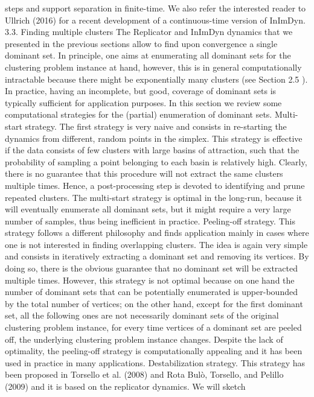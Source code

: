 \documentclass[a4paper]{article}
\begin{document}
steps and support separation in finite-time. We also refer the
interested reader to Ullrich (2016) for a recent development of a
continuous-time version of InImDyn.
3.3. Finding multiple clusters
The Replicator and InImDyn dynamics that we presented in the
previous sections allow to find upon convergence a single dominant
set. In principle, one aims at enumerating all dominant sets for the
clustering problem instance at hand, however, this is in general
computationally intractable because there might be exponentially
many clusters (see Section 2.5 ). In practice, having an incomplete,
but good, coverage of dominant sets is typically sufficient for application
purposes. In this section we review some computational
strategies for the (partial) enumeration of dominant sets.
Multi-start strategy. The first strategy is very naive and consists
in re-starting the dynamics from different, random points in
the simplex. This strategy is effective if the data consists of few
clusters with large basins of attraction, such that the probability of
sampling a point belonging to each basin is relatively high. Clearly,
there is no guarantee that this procedure will not extract the same
clusters multiple times. Hence, a post-processing step is devoted
to identifying and prune repeated clusters. The multi-start strategy
is optimal in the long-run, because it will eventually enumerate
all dominant sets, but it might require a very large number of
samples, thus being inefficient in practice.
Peeling-off strategy. This strategy follows a different philosophy
and finds application mainly in cases where one is not interested
in finding overlapping clusters. The idea is again very simple and
consists in iteratively extracting a dominant set and removing its
vertices. By doing so, there is the obvious guarantee that no dominant
set will be extracted multiple times. However, this strategy
is not optimal because on one hand the number of dominant
sets that can be potentially enumerated is upper-bounded by the
total number of vertices; on the other hand, except for the first
dominant set, all the following ones are not necessarily dominant
sets of the original clustering problem instance, for every time
vertices of a dominant set are peeled off, the underlying clustering
problem instance changes. Despite the lack of optimality, the
peeling-off strategy is computationally appealing and it has been
used in practice in many applications.
Destabilization strategy. This strategy has been proposed
in Torsello et al. (2008) and Rota Bulò, Torsello, and Pelillo
(2009) and it is based on the replicator dynamics. We will sketch
\end{document}
